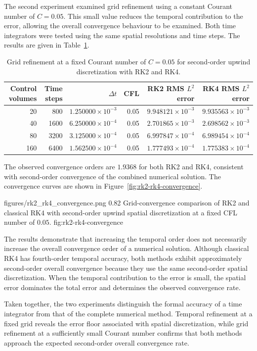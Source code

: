 The second experiment examined grid refinement using a constant Courant number of $C=0.05$. This small value reduces the temporal contribution to the error, allowing the overall convergence behaviour to be examined. Both time integrators were tested using the same spatial resolutions and time steps. The results are given in Table~\ref{tab:grid-refinement-fixed-cfl}.

\begin{table}[!htbp]
    \centering
    \caption{Grid refinement at a fixed Courant number of $C=0.05$ for second-order upwind discretization with RK2 and RK4.}
    \label{tab:grid-refinement-fixed-cfl}
    \footnotesize
    \setlength{\tabcolsep}{3.5pt}
    \begin{tabular}{r r r r r r}
        \toprule
        Control volumes & Time steps & $\Delta t$ & CFL & \shortstack{RK2 RMS \\$L^2$ error} & \shortstack{RK4 RMS \\$L^2$ error} \\
        \midrule
        20  & 800  & $1.250000\times10^{-3}$ & 0.05 & $9.948121\times10^{-3}$ & $9.935563\times10^{-3}$ \\
        40  & 1600 & $6.250000\times10^{-4}$ & 0.05 & $2.701865\times10^{-3}$ & $2.698562\times10^{-3}$ \\
        80  & 3200 & $3.125000\times10^{-4}$ & 0.05 & $6.997847\times10^{-4}$ & $6.989454\times10^{-4}$ \\
        160 & 6400 & $1.562500\times10^{-4}$ & 0.05 & $1.777493\times10^{-4}$ & $1.775383\times10^{-4}$ \\
        \bottomrule
    \end{tabular}
\end{table}

The observed convergence orders are $1.9368$ for both RK2 and RK4, consistent with second-order convergence of the combined numerical solution. The convergence curves are shown in Figure~\ref{fig:rk2-rk4-convergence}.

\resultfigure
    {figures/rk2_rk4_convergence.png}
    {0.82}
    {Grid-convergence comparison of RK2 and classical RK4 with second-order upwind spatial discretization at a fixed CFL number of $0.05$.}
    {fig:rk2-rk4-convergence}

The results demonstrate that increasing the temporal order does not necessarily increase the overall convergence order of a numerical solution. Although classical RK4 has fourth-order temporal accuracy, both methods exhibit approximately second-order overall convergence because they use the same second-order spatial discretization. When the temporal contribution to the error is small, the spatial error dominates the total error and determines the observed convergence rate.

Taken together, the two experiments distinguish the formal accuracy of a time integrator from that of the complete numerical method. Temporal refinement at a fixed grid reveals the error floor associated with spatial discretization, while grid refinement at a sufficiently small Courant number confirms that both methods approach the expected second-order overall convergence rate.
